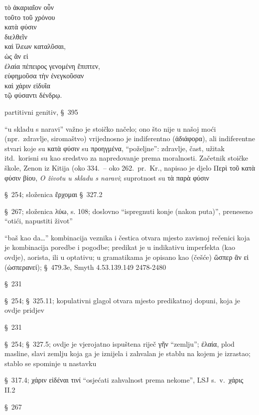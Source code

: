 {\large
\begin{greek}
\noindent τὸ ἀκαριαῖον οὖν \\
τοῦτο τοῦ χρόνου \\
\tabto{2em} κατὰ φύσιν \\
διελθεῖν \\
καὶ ἵλεων καταλῦσαι, \\
ὡς ἂν εἰ \\
\tabto{2em} ἐλαία πέπειρος γενομένη ἔπιπτεν, \\
\tabto{4em} εὐφημοῦσα τὴν ἐνεγκοῦσαν \\
\tabto{4em} καὶ χάριν εἰδυῖα \\
\tabto{6em} τῷ φύσαντι δένδρῳ.\\

\end{greek}
}

\begin{description}[noitemsep]
\item[τοῦτο τοῦ χρόνου] partitivni genitiv, §~395
\item[κατὰ φύσιν] ``u skladu s naravi'' važno je stoičko načelo; ono što nije u našoj moći (npr.\ zdravlje, siromaštvo) vrijednosno je indiferentno (ἀδιάφορα), ali indiferentne stvari koje su κατὰ φύσιν su προηγμένα, ``poželjne'': zdravlje, čast, užitak itd.\ korisni su kao sredstvo za napredovanje prema moralnosti. Začetnik stoičke škole, Zenon iz Kitija (oko 334.\ – oko 262.\ pr.~Kr., napisao je djelo Περὶ τοῦ κατὰ φύσιν βίου, \textit{O životu u skladu s naravi}; suprotnost su τὰ παρὰ φύσιν
\item[διελθεῖν] §~254; složenica ἔρχομαι §~327.2
\item[καταλῦσαι] §~267; složenica λύω, s. 108; doslovno ``ispregnuti konje (nakon puta)'', preneseno ``otići, napustiti život''
\item[ὡς ἂν εἰ] ``baš kao da\dots'' kombinacija veznika i čestica otvara mjesto zavisnoj rečenici koja je kombinacija poredbe i pogodbe; predikat je u indikativu imperfekta (kao ovdje), aorista, ili u optativu; u gramatikama je opisano kao (češće) ὥσπερ ἂν εἰ (ὡσπερανεί); §~479.3e, Smyth 4.53.139.149 2478-2480
\item[ἔπιπτεν] §~231
\item[πέπειρος γενομένη] §~254; §~325.11; kopulativni glagol otvara mjesto predikatnoj dopuni, koja je ovdje pridjev
\item[εὐφημοῦσα] §~231
\item[τὴν ἐνεγκοῦσαν] §~254; §~327.5; ovdje je vjerojatno ispuštena riječ γῆν
``zemlju''; \textgreek{ἐλαία,} plod masline, slavi zemlju koja ga je iznijela i zahvalan je stablu na kojem je izrastao; stablo se spominje u nastavku
\item[εἰδυῖα] §~317.4; χάριν εἰδέναι τινί ``osjećati zahvalnost prema nekome'', LSJ s.~v.\ χάρις II.2
\item[φύσαντι] §~267
\end{description}


